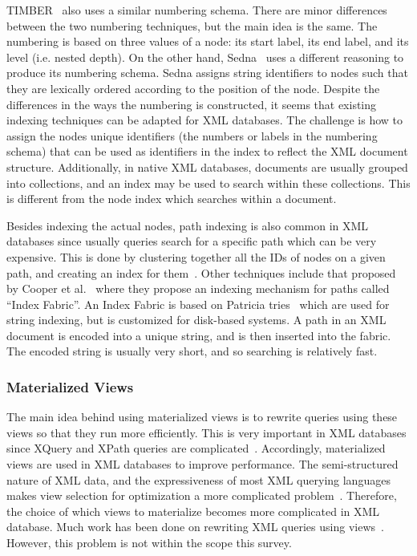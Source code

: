 \documentclass[12pt,a4paper]{article}
\begin{document}
TIMBER~\cite{jagadish2002timber} also uses a similar numbering schema. There are minor differences between the two numbering techniques, but the main idea is
the same. The numbering is
based on three values of a node: its start label, its end label, and its level (i.e. nested depth). On the other hand, Sedna~\cite{taranov2010sedna} uses a
different reasoning to produce its numbering schema. Sedna assigns string identifiers to nodes such that they are lexically ordered according to the position
of the node. Despite the differences in the ways the numbering is constructed, it seems that existing indexing techniques can be adapted for XML databases. The
challenge is how to assign the nodes unique identifiers (the numbers or labels in the numbering schema) that can be used as identifiers in the index to
reflect the XML document structure. Additionally, in native XML databases, documents are usually grouped into collections, and an index may be used to search
within these collections. This is different from the node index which searches within a document.

Besides indexing the actual nodes, path indexing is also common in XML databases since usually queries search for a specific path which can be very expensive.
This is done by clustering together all the IDs of nodes on a given path, and creating an index for them~\cite{milo1999index, arion2008path}. Other techniques
include that proposed by Cooper et al.~\cite{cooper2001} where they propose an indexing mechanism for paths called ``Index Fabric''. An Index Fabric is based on
Patricia tries~\cite{knuth1998} which are used for string indexing, but is customized for disk-based systems. A path in an XML document is encoded into a unique
string, and is then inserted into the fabric. The encoded string is usually very short, and so searching is relatively fast.


\subsubsection{Materialized Views}

The main idea behind using materialized views is to rewrite queries using these views so that they run more efficiently. This is very important in XML
databases since XQuery and XPath queries are complicated~\cite{arion2007structured}. Accordingly, materialized views are used in XML databases to improve
performance. The semi-structured nature of
XML data, and the expressiveness of most XML querying languages makes view selection for optimization a more complicated
problem~\cite{tang2009materialized}. Therefore, the choice of which views to materialize becomes more complicated in XML database. Much work has been
done on rewriting XML queries using views~\cite{arion2007structured, balmin2004framework, aouiche2006clustering, tang2008multiple}. However, this problem is not
within the scope this survey.
\end{document}

